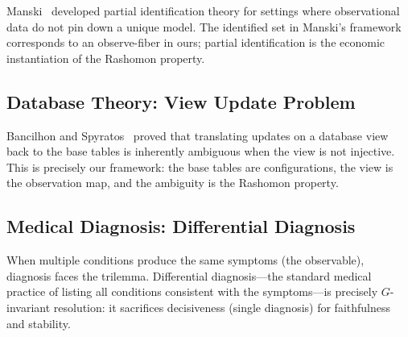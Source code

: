 \documentclass[11pt]{article}
\begin{document}
Manski~\cite{manski2003partial} developed partial identification theory
for settings where observational data do not pin down a unique model.
The identified set in Manski's framework corresponds to an observe-fiber
in ours; partial identification is the economic instantiation of the
Rashomon property.

\subsection{Database Theory: View Update Problem}

Bancilhon and Spyratos~\cite{bancilhon1981update} proved that translating
updates on a database view back to the base tables is inherently ambiguous
when the view is not injective. This is precisely our framework: the base
tables are configurations, the view is the observation map, and the
ambiguity is the Rashomon property.

\subsection{Medical Diagnosis: Differential Diagnosis}

When multiple conditions produce the same symptoms (the observable),
diagnosis faces the trilemma. Differential diagnosis---the standard
medical practice of listing all conditions consistent with the
symptoms---is precisely $G$-invariant resolution: it sacrifices
decisiveness (single diagnosis) for faithfulness and stability.




\end{document}
